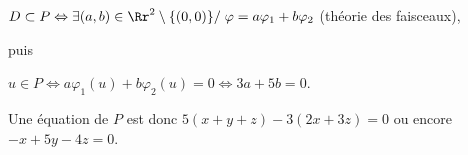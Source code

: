 {\begin{enumerate}
{\begin{center}
$D\subset P\Leftrightarrow\exists(a,b)\in\Rr^2\setminus\{(0,0)\}/\;\varphi= a\varphi_1+b\varphi_2$ (théorie des faisceaux),
\end{center}

puis

\begin{center}
$u\in P\Leftrightarrow a\varphi_1(u)+b\varphi_2(u) = 0\Leftrightarrow 3a + 5b = 0$.
\end{center}

Une équation de $P$ est donc $5(x+y+z)-3(2x+3z) = 0$ ou encore $-x + 5y -4z = 0$.}
\end{enumerate}
}